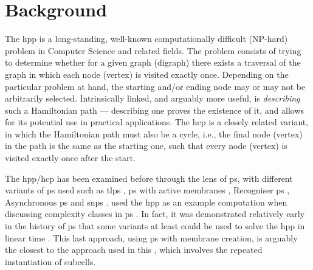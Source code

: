 \section{Background}

The \gls{hpp} is a long-standing, well-known computationally difficult (NP-hard) problem in Computer Science and related fields.  The problem consists of trying to determine whether for a given graph (digraph) there exists a traversal of the graph in which each node (vertex) is visited exactly once.  Depending on the particular problem at hand, the starting and/or ending node may or may not be arbitrarily selected.  Intrinsically linked, and arguably more useful, is \emph{describing} such a Hamiltonian path --- describing one proves the existence of it, and allows for its potential use in practical applications.  The \gls{hcp} is a closely related variant, in which the Hamiltonian path must also be a cycle, i.e., the final node (vertex) in the path is the same as the starting one, such that every node (vertex) is visited exactly once after the start.


The \gls{hpp}/\gls{hcp} has been examined before through the lens of \gls{ps}, with different variants of \gls{ps} used such as \gls{tlps} \cite{Martin-Vide2003}, \gls{ps} with active membranes \cite{Pan2006,Song2013}, Recogniser \gls{ps} \cite{Chen2009}, Asynchronous \gls{ps} \cite{Tagawa2012} and \gls{snps} \cite{Xue2013}.  \citeauthor{Jimenez2003} used the \gls{hpp} as an example computation when discussing complexity classes in \gls{ps} \cite{Jimenez2003}.  In fact, it was demonstrated relatively early in the history of \gls{ps} that some variants at least could be used to solve the \gls{hpp} in linear time \cite{Mutyam2001}.  This last approach, using \gls{ps} with membrane creation, is arguably the closest to the approach used in this , which involves the repeated instantiation of subcells.

